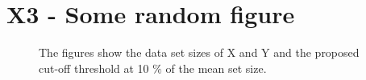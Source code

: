 \newpage
\section*{\large{X3 - Some random figure}}
\vspace*{1cm}

\begin{figure}[H]
  \centering
  \hfill
  \caption[Data set sizes]{The figures show the data set sizes of X and Y and the proposed cut-off threshold at 10 $\%$ of the mean set size.}
\end{figure}

\fi

